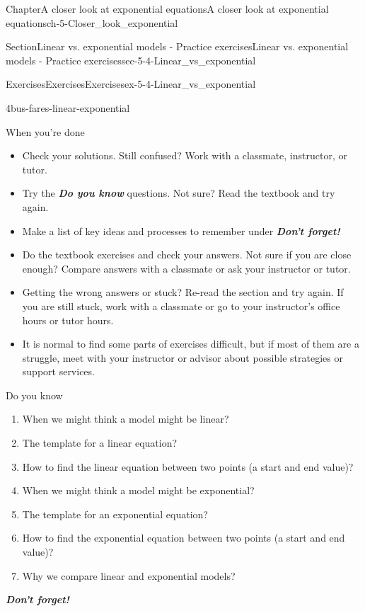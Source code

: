 \documentclass[twoside,11pt,]{book}
\newcommand{\alert}[1]{\textbf{\textit{#1}}}
\numberwithin{equation}{section}
\begin{document}
\begin{chapterptx}{Chapter}{A closer look at exponential equations}{}{A closer look at exponential equations}{}{}{ch-5-Closer_look_exponential}
\begin{sectionptx}{Section}{Linear vs. exponential models - Practice exercises}{}{Linear vs. exponential models - Practice exercises}{}{}{sec-5-4-Linear_vs_exponential}
\begin{exercises-subsection-numberless}{Exercises}{Exercises}{}{Exercises}{}{}{ex-5-4-Linear_vs_exponential}
\begin{divisionexercise}{4}{}{}{bus-fares-linear-exponential}
\end{divisionexercise}%
\end{exercises-subsection-numberless}
\begin{conclusion}{When you're done \textellipsis{}}%
%
\begin{itemize}[label=\textbullet]
\item{}Check your solutions. Still confused? Work with a classmate, instructor, or tutor.%
\item{}Try the \alert{Do you know} questions. Not sure? Read the textbook and try again.%
\item{}Make a list of key ideas and processes to remember under \alert{Don't forget!}%
\item{}Do the textbook exercises and check your answers. Not sure if you are close enough? Compare answers with a classmate or ask your instructor or tutor.%
\item{}Getting the wrong answers or stuck? Re-read the section and try again. If you are still stuck, work with a classmate or go to your instructor's office hours or tutor hours.%
\item{}It is normal to find some parts of exercises difficult, but if most of them are a struggle, meet with your instructor or advisor about possible strategies or support services.%
\end{itemize}
%
\end{conclusion}%
\begin{conclusion}{Do you know \textellipsis{}}%
%
\begin{enumerate}[label={\Alph*.}]
\item{}When we might think a model might be linear?%
\item{}The template for a linear equation?%
\item{}How to find the linear equation between two points (a start and end value)?%
\item{}When we might think a model might be exponential?%
\item{}The template for an exponential equation?%
\item{}How to find the exponential equation between two points (a start and end value)?%
\item{}Why we compare linear and exponential models?%
\end{enumerate}
%
\par
\alert{Don't forget!}%
\end{conclusion}%
\end{sectionptx}
%
%
\typeout{************************************************}

\end{chapterptx}
\end{document}
